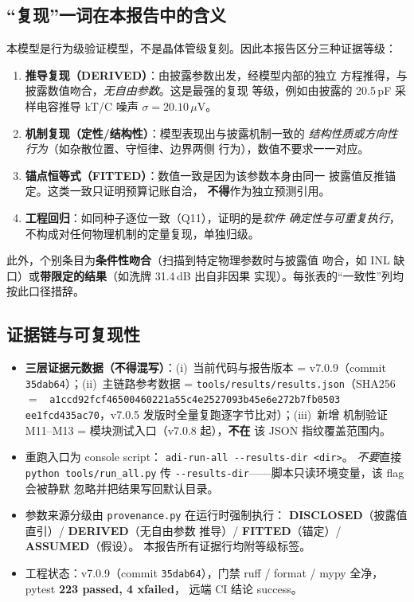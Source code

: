 \documentclass[11pt,a4paper,fontset=fandol]{ctexart}
\newcommand{\GRADE}[1]{\textbf{#1}}
\newcommand{\uV}{\ensuremath{\,\mu\mathrm{V}}}
\begin{document}
\subsection{``复现''一词在本报告中的含义}

本模型是行为级验证模型，不是晶体管级复刻。因此本报告区分三种证据等级：

\begin{enumerate}[itemsep=1pt]
  \item \textbf{推导复现（DERIVED）}：由披露参数出发，经模型内部的独立
        方程推得，与披露数值吻合，\emph{无自由参数}。这是最强的复现
        等级，例如由披露的 20.5\,pF 采样电容推导 kT/C 噪声
        $\sigma = 20.10\uV$。
  \item \textbf{机制复现（定性/结构性）}：模型表现出与披露机制一致的
        \emph{结构性质或方向性行为}（如杂散位置、守恒律、边界两侧
        行为），数值不要求一一对应。
  \item \textbf{锚点恒等式（FITTED）}：数值一致是因为该参数本身由同一
        披露值反推锚定。这类一致只证明预算记账自洽，
        \textbf{不得}作为独立预测引用。
  \item \textbf{工程回归}：如同种子逐位一致（Q11），证明的是\emph{软件
        确定性与可重复执行}，不构成对任何物理机制的定量复现，单独归级。
\end{enumerate}

此外，个别条目为\textbf{条件性吻合}（扫描到特定物理参数时与披露值
吻合，如 INL 缺口）或\textbf{带限定的结果}（如洗牌 31.4\,dB 出自非因果
实现）。每张表的``一致性''列均按此口径措辞。

\subsection{证据链与可复现性}

\begin{itemize}[itemsep=1pt]
  \item \textbf{三层证据元数据（不得混写）}：(i)~当前代码与报告版本
        = v7.0.9（commit \texttt{35dab64}）；(ii)~主链路参考数据 =
        \texttt{tools/results/results.json}（SHA256~$=$~
        \texttt{a1ccd92fcf46500460221a55c4e2527093b45e6e272b7fb0503
        ee1fcd435ac70}，v7.0.5 发版时全量复跑逐字节比对）；(iii)~新增
        机制验证 M11--M13 = 模块测试入口（v7.0.8 起），\textbf{不在}
        该 JSON 指纹覆盖范围内。
  \item 重跑入口为 console script：
        \texttt{adi-run-all -{}-results-dir <dir>}。
        \emph{不要}直接 \texttt{python tools/run\_all.py} 传
        \texttt{-{}-results-dir}——脚本只读环境变量，该 flag 会被静默
        忽略并把结果写回默认目录。
  \item 参数来源分级由 \texttt{provenance.py} 在运行时强制执行：
        \GRADE{DISCLOSED}（披露值直引）/ \GRADE{DERIVED}（无自由参数
        推导）/ \GRADE{FITTED}（锚定）/ \GRADE{ASSUMED}（假设）。
        本报告所有证据行均附等级标签。
  \item 工程状态：v7.0.9（commit \texttt{35dab64}），门禁 ruff /
        format / mypy 全净，pytest \textbf{223 passed, 4 xfailed}，
        远端 CI 结论 success。
\end{itemize}
\end{document}
